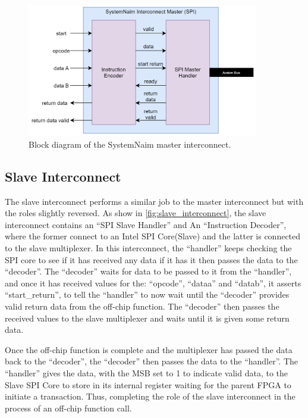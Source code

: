 \begin{figure}[!h]
    \centering
    \includegraphics[width=0.9\textwidth]{04_Implementation/images/interconnect_block_diagram.png}
    \caption{Block diagram of the SystemNaim master interconnect.}
    \label{fig:master_interconnect}
\end{figure}

\subsection{Slave Interconnect}

The slave interconnect performs a similar job to the master interconnect but with the roles slightly reversed. As show in \autoref{fig:slave_interconnect}, the slave interconnect contains an “SPI Slave Handler” and An “Instruction Decoder”, where the former connect to an Intel SPI Core(Slave) and the latter is connected to the slave multiplexer. In this interconnect, the “handler” keeps checking the SPI core to see if it has received any data if it has it then passes the data to the “decoder”. The “decoder” waits for data to be passed to it from the “handler”, and once it has received values for the: “opcode”, “dataa” and “datab”, it asserts “start\_return”, to tell the “handler” to now wait until the “decoder” provides valid return data from the off-chip function. The “decoder” then passes the received values to the slave multiplexer and waits until it is given some return data.

Once the off-chip function is complete and the multiplexer has passed the data back to the “decoder”, the “decoder” then passes the data to the “handler”. The “handler” gives the data, with the MSB set to 1 to indicate valid data, to the Slave SPI Core to store in its internal register waiting for the parent FPGA to initiate a transaction. Thus, completing the role of the slave interconnect in the process of an off-chip function call.

